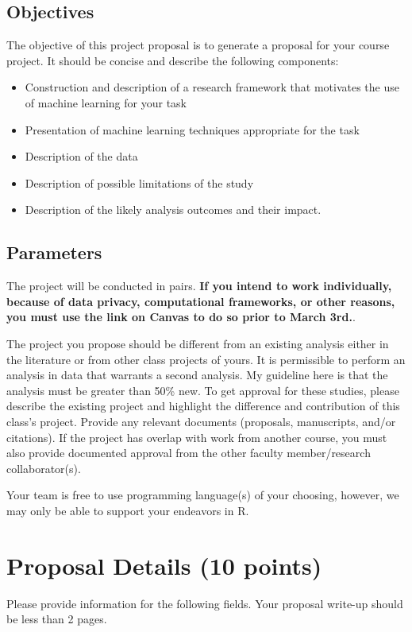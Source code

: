 \documentclass[twoside,11pt]{article}
\begin{document}
\subsection{Objectives}
The objective of this project proposal is to generate a proposal for your course project. It should be concise and describe the following components:
\begin{itemize}
\item Construction and description of a research framework that motivates the use of machine learning for your task
\item Presentation of machine learning techniques appropriate for the task
\item Description of the data
\item Description of possible limitations of the study
\item Description of the likely analysis outcomes and their impact.
\end{itemize}

\subsection{Parameters}
The project will be conducted in pairs. \textbf{If you intend to work individually, because of data privacy, computational frameworks, or other reasons, you must use the link on Canvas to do so prior to March 3rd.}.

The project you propose should be different from an existing analysis either in the literature or from other class projects of yours. It is permissible to perform an analysis in data that warrants a second analysis. My guideline here is that the analysis must be greater than 50\% new. To get approval for these studies, please describe the existing project and highlight the difference and contribution of this class's project. Provide any relevant documents (proposals, manuscripts, and/or citations). If the project has overlap with work from another course, you must also provide documented approval from the other faculty member/research collaborator(s). 

Your team is free to use programming language(s) of your choosing, however, we may only be able to support your endeavors in R.

\section{Proposal Details (10 points)} \label{details}
Please provide information for the following fields. Your proposal write-up should be less than 2 pages.
\end{document}
